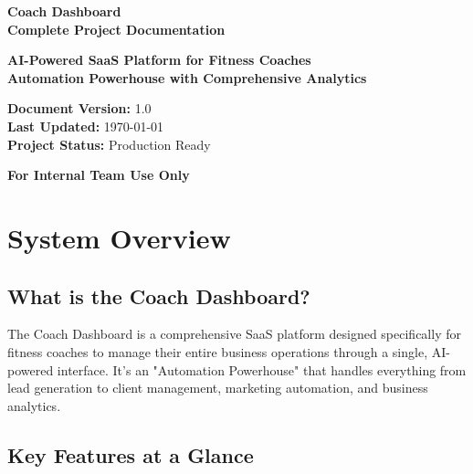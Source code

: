 \documentclass[12pt,a4paper]{article}
\begin{document}
\begin{titlepage}
    \centering
    \vspace*{2cm}
    
    {\Huge\bfseries\color{blue} Coach Dashboard}\\[0.5cm]
    {\Large\bfseries Complete Project Documentation}\\[1cm]
    
    \vspace{1cm}
    
    {\large\textbf{AI-Powered SaaS Platform for Fitness Coaches}}\\[0.5cm]
    {\large\textbf{Automation Powerhouse with Comprehensive Analytics}}\\[1cm]
    
    \vspace{2cm}
    
    {\large\textbf{Document Version:} 1.0}\\[0.5cm]
    {\large\textbf{Last Updated:} \today}\\[0.5cm]
    {\large\textbf{Project Status:} Production Ready}\\[1cm]
    
    \vfill
    
    {\large\textbf{For Internal Team Use Only}}
\end{titlepage}

\tableofcontents
\newpage

\section{System Overview}

\subsection{What is the Coach Dashboard?}

The Coach Dashboard is a comprehensive SaaS platform designed specifically for fitness coaches to manage their entire business operations through a single, AI-powered interface. It's an "Automation Powerhouse" that handles everything from lead generation to client management, marketing automation, and business analytics.

\subsection{Key Features at a Glance}
\end{document}
